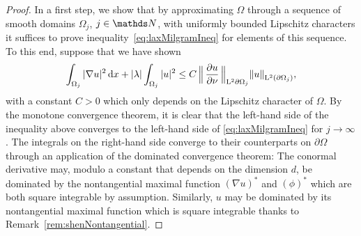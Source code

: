 \begin{proof}
  In a first step, we show that by approximating $\Omega$ through a sequence of smooth domains $\Omega_j$, $j \in \N$, with uniformly bounded Lipschitz characters it suffices to prove inequality~\eqref{eq:laxMilgramIneq} for elements of this sequence.
  To this end, suppose that we have shown 
  \begin{align*}
    \int_{\Omega_j} |\nabla u|^2 \, {\operatorname{d}\!{x}} + |\lambda| \int_{\Omega_j} |u|^2 \leq C \,\Big\|\, \frac{\partial u}{\partial \nu} \, \Big\|^{}_{\mathrm{L}^2{\partial\Omega_j}}  \|u\|^{}_{\mathrm{L}^2(\partial\Omega_j)},
  \end{align*}
  with a constant $C > 0$ which only depends on the Lipschitz character of $\Omega$.
  By the monotone convergence theorem, it is clear that the left-hand side of the inequality above converges to the left-hand side of \eqref{eq:laxMilgramIneq} for $j \to \infty$.
  The integrals on the right-hand side converge to their counterparts on $\partial\Omega$ through an application of the dominated convergence theorem: The conormal derivative may, modulo a constant that depends on the dimension $d$, be dominated by the nontangential maximal function $(\nabla u)^*$ and $(\phi)^*$ which are both square integrable by assumption.
  Similarly, $u$ may be dominated by its nontangential maximal function which is square integrable thanks to Remark~\ref{rem:shenNontangential}.


\end{proof}

